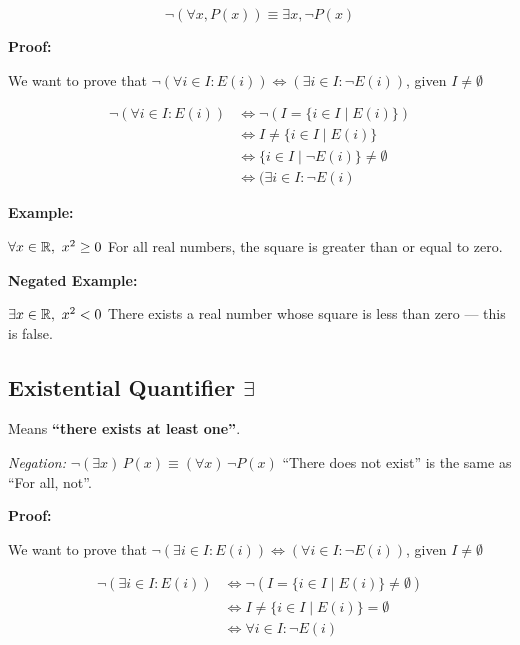 \[
	\neg (\forall x, P(x)) \equiv \exists x, \neg P(x)
\]

\textbf{Proof:}

We want to prove that \(\neg (\forall i \in I : E(i)) \iff (\exists i \in I: \neg E(i))\), given \(I \neq \emptyset\)

\begin{align*}
	\neg (\forall i \in I : E(i)) & \iff \neg (I = \{i \in I \mid E(i)\})          \\
	                              & \iff I \neq \{i \in I \mid E(i)\}              \\
	                              & \iff \{i \in I \mid \neg E(i)\} \neq \emptyset \\
	                              & \iff (\exists i \in I : \neg E(i)
\end{align*}

\QED

\textbf{Example:}

\(\forall x \in \mathbb{R},\ x^2 \geq 0\) For all real numbers, the square is greater than or equal to zero.

\textbf{Negated Example:}

\(\exists x \in \mathbb{R},\ x^2 < 0\) There exists a real number whose square is less than zero — this is
false.

\subsection{Existential Quantifier \texorpdfstring{\(\exists\)}{}}

Means \textbf{``there exists at least one''}.

\emph{Negation:}  \(\neg (\exists x)\,P(x) \equiv (\forall x)\, \neg P(x)\) ``There does not exist'' is
the same as ``For all, not''.

\textbf{Proof:}

We want to prove that \(\neg (\exists i \in I : E(i)) \iff (\forall i \in I: \neg E(i))\), given \(I \neq \emptyset\)

\begin{align*}
	\neg (\exists i \in I : E(i)) & \iff \neg (I = \{i \in I \mid E(i)\} \neq \emptyset) \\
	                              & \iff  I \neq \{i \in I \mid E(i)\} = \emptyset       \\
	                              & \iff \forall i \in I: \neg E(i)
\end{align*}

\QED

